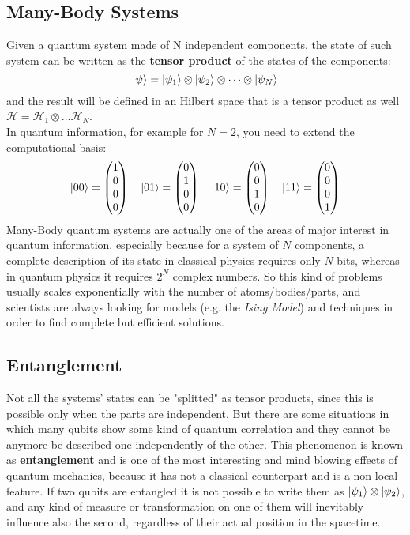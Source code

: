 \subsection{Many-Body Systems}
Given a quantum system made of N independent components, the state of such system can be written as the \textbf{tensor product} of the states of the components:
\[ \ket{\psi} = \ket{\psi_1}\otimes\ket{\psi_2}\otimes\dots\otimes\ket{\psi_N} \]
and the result will be defined in an Hilbert space that is a tensor product as well $\mathcal{H} = \mathcal{H}_1\otimes\dots\mathcal{H}_N$.\\
In quantum information, for example for $N=2$, you need to extend the computational basis:
\[ \ket{00} = \begin{pmatrix}1\\0\\0\\0\end{pmatrix} \quad \ket{01} = \begin{pmatrix}0\\1\\0\\0\end{pmatrix} \quad \ket{10} = \begin{pmatrix}0\\0\\1\\0\end{pmatrix} \quad \ket{11} = \begin{pmatrix}0\\0\\0\\1\end{pmatrix} \]
Many-Body quantum systems are actually one of the areas of major interest in quantum information, especially because for a system of $N$ components, a complete description of its state in classical physics requires only $N$ bits, whereas in quantum physics it requires $2^N$ complex numbers. So this kind of problems usually scales exponentially with the number of atoms/bodies/parts, and scientists are always looking for models (e.g. the \textit{Ising Model}) and techniques in order to find complete but efficient solutions.\\

\subsection{Entanglement}
Not all the systems' states can be "splitted" as tensor products, since this is possible only when the parts are independent. But there are some situations in which many qubits show some kind of quantum correlation and they cannot be anymore be described one independently of the other. This phenomenon is known as \textbf{entanglement} and is one of the most interesting and mind blowing effects of quantum mechanics, because it has not a classical counterpart and is a non-local feature. If two qubits are entangled it is not possible to write them as $\ket{\psi_1}\otimes\ket{\psi_2}$, and any kind of measure or transformation on one of them will inevitably influence also the second, regardless of their actual position in the spacetime.\\

